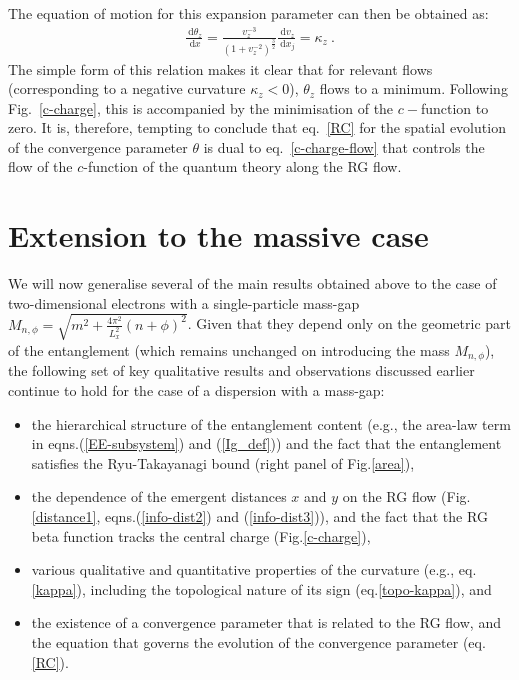 The equation of motion for this expansion parameter can then be obtained as:
\begin{equation}\begin{aligned}
\frac{\:\mathrm{d}\theta_z}{\:\mathrm{d}x} = \frac{v_z^{-3}}{\left(1 + v_z^{-2}\right)^\frac{3}{2}} \frac{\:\mathrm{d}v_z}{\:\mathrm{d}x_j} = \kappa_z~.
\label{RC}
\end{aligned}\end{equation}
The simple form of this relation makes it clear that for relevant flows (corresponding to a negative curvature \(\kappa_z<0\)), \(\theta_z\) flows to a minimum. Following Fig.~\ref{c-charge}, this is accompanied by the minimisation of the \(c-\)function to zero. It is, therefore, tempting to conclude that eq.~\eqref{RC} for the spatial evolution of the convergence parameter $\theta$ is dual to eq.~\eqref{c-charge-flow} that controls the flow of the $c$-function of the quantum theory along the RG flow.

\section{Extension to the massive case}
\label{massive}
We will now generalise several of the main results obtained above to the case of two-dimensional electrons with a single-particle mass-gap  \(M_{n,\phi} = \sqrt{m^2 + \frac{4\pi^2}{L_x^2}(n + \phi)^2}\). Given that they depend only on the geometric part of the entanglement (which remains unchanged on introducing the mass $M_{n,\phi}$), the following set of key qualitative results and observations discussed earlier continue to hold for the case of a dispersion with a mass-gap:
\begin{itemize}
	\item the hierarchical structure of the entanglement content (e.g., the area-law term in eqns.(\ref{EE-subsystem}) and (\ref{Ig_def})) and the fact that the entanglement satisfies the Ryu-Takayanagi bound (right panel of Fig.\ref{area}),
	\item the dependence of the emergent distances \(x\) and \(y\) on the RG flow (Fig.\ref{distance1}, eqns.(\ref{info-dist2}) and (\ref{info-dist3})), and the fact that the RG beta function tracks the central charge (Fig.\ref{c-charge}),
	\item various qualitative and quantitative properties of the curvature (e.g., eq.\eqref{kappa}), including the topological nature of its sign (eq.\eqref{topo-kappa}), and
	\item the existence of a convergence parameter that is related to the RG flow, and the 
	equation that governs the evolution of the convergence parameter (eq.\eqref{RC}).
\end{itemize}

